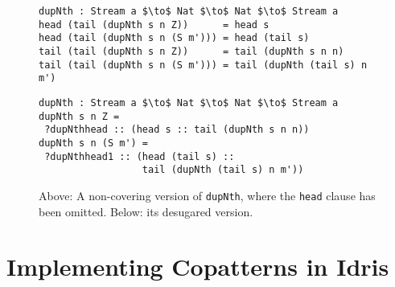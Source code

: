 \begin{figure}
\begin{lstlisting}[mathescape]
dupNth : Stream a $\to$ Nat $\to$ Nat $\to$ Stream a
head (tail (dupNth s n Z))      = head s
head (tail (dupNth s n (S m'))) = head (tail s)
tail (tail (dupNth s n Z))      = tail (dupNth s n n)
tail (tail (dupNth s n (S m'))) = tail (dupNth (tail s) n m')
\end{lstlisting}
\begin{lstlisting}[mathescape]
dupNth : Stream a $\to$ Nat $\to$ Nat $\to$ Stream a
dupNth s n Z = 
 ?dupNthhead :: (head s :: tail (dupNth s n n))
dupNth s n (S m') = 
 ?dupNthhead1 :: (head (tail s) :: 
                  tail (dupNth (tail s) n m'))
\end{lstlisting}

  \caption{Above: A non-covering version of \texttt{dupNth}, where the \texttt{head}
    clause has been omitted. Below: its desugared version.}
  \label{fig:dupNth_partial}
\end{figure}


\section{Implementing Copatterns in Idris}



